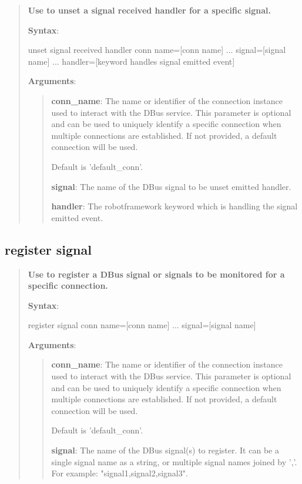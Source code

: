 \begin{quote}
\textbf{Use to unset a signal received handler for a specific signal.}

\textbf{Syntax}:
\begin{robotcode}
unset signal received handler 	conn name=[conn name] 
...                           	signal=[signal name]
...                           	handler=[keyword handles signal emitted event]
\end{robotcode}

\textbf{Arguments}:

\begin{quote}
\textbf{conn\_name}: The name or identifier of the connection instance used to interact with the DBus service.
  This parameter is optional and can be used to uniquely identify a specific connection
  when multiple connections are established. If not provided, a default connection will be used.

  Default is 'default\_conn'.

\vspace{\baselineskip}

\textbf{signal}: The name of the DBus signal to be unset emitted handler.

\vspace{\baselineskip}

\textbf{handler}:  The robotframework keyword which is handling the signal emitted event.
\end{quote}
\end{quote}

\hypertarget{description-register-signal}{%
\subsection{\texorpdfstring{\textbf{register signal}}{register signal}}\label{description-register-signal}}
\begin{quote}
\textbf{Use to register a DBus signal or signals to be monitored for a specific connection.}

\textbf{Syntax}:
\begin{robotcode}
register signal 	conn name=[conn name] 
...             	signal=[signal name]
\end{robotcode}

\textbf{Arguments}:

\begin{quote}
\textbf{conn\_name}: The name or identifier of the connection instance used to interact with the DBus service.
  This parameter is optional and can be used to uniquely identify a specific connection
  when multiple connections are established. If not provided, a default connection will be used.

  Default is 'default\_conn'.

\vspace{\baselineskip}

\textbf{signal}: The name of the DBus signal(s) to register. It can be a single signal name as a string,
  or multiple signal names joined by ','. For example: "signal1,signal2,signal3".
\end{quote}
\end{quote}

